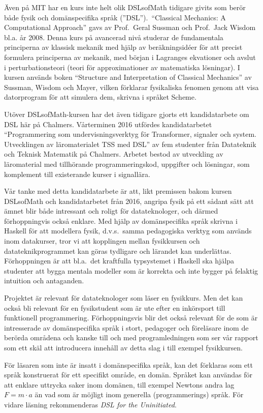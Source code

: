 \begin{draft}
Även på MIT har en kurs inte helt olik DSLsofMath tidigare givits som berör både
fysik och domänspecifika språk (''DSL'').\ ``Classical Mechanics: A Computational Approach'' gavs av
Prof.\ Geral Sussman och Prof.\ Jack Wisdom bl.a. år
2008.\cite{classical-mechanics-course-mit-2008}
Denna kurs på avancerad nivå studerar de fundamentala principerna av klassisk
mekanik med hjälp av beräkningsidéer för att precist formulera principerna av
mekanik, med början i Lagranges ekvationer och avslut i
perturbationsteori (teori för approximationer av matematiska lösningar). I kursen används boken ``Structure and %
Interpretation of Classical Mechanics'' av Sussman, Wisdom och Mayer,
vilken förklarar fysikaliska fenomen genom att visa datorprogram för att
simulera dem, skrivna i språket Scheme.\cite{SICM}

Utöver DSLsofMath-kursen har det även tidigare gjorts ett kandidatarbete om DSL 
här på Chalmers. Vårterminen 2016 utfördes kandidatarbetet
``Programmering som undervisningsverktyg för Transformer, signaler och
system. Utvecklingen av läromaterialet TSS med DSL'' av fem studenter
från Datateknik och Teknisk Matematik på Chalmers. Arbetet bestod av
utveckling av läromaterial med tillhörande programmeringskod,
uppgifter och lösningar, som komplement till existerande kurser i
signallära.\cite{kandidat2016}

Vår tanke med detta kandidatarbete är att, likt premissen bakom kursen DSLsofMath
och kandidatarbetet från 2016, angripa fysik på ett sådant sätt att ämnet blir både
intressant och roligt för datateknologer, och därmed förhoppningvis
också enklare. Med hjälp av domänspecifika språk skrivna i Haskell för att
modellera fysik, d.v.s.\ samma pedagogiska verktyg som används inom           %
datakurser, tror vi att kopplingen mellan fysikkursen och
datateknikprogrammet kan göras tydligare och lärandet kan underlättas.
Förhoppningen är att bl.a.\ det kraftfulla typsystemet i Haskell ska
hjälpa studenter att bygga mentala modeller som är korrekta och inte
bygger på felaktig intuition och antaganden.

Projektet är relevant för datateknologer som läser en fysikkurs. Men
det kan också bli relevant för en fysikstudent som är ute efter en
inkörsport till funktionell programmering. Förhoppningsvis blir det
också relevant för de som är intresserade av domänspecifika språk i
stort, pedagoger och föreläsare inom de berörda områdena och kanske
till och med programledningen som ser vår rapport som ett skäl att
introducera innehåll av detta slag i till exempel fysikkursen.

För läsaren som inte är insatt i domänspecifika språk, kan det
förklaras som ett språk konstruerat för ett specifikt område, en
domän. Språket kan användas för att enklare uttrycka saker inom
domänen, till exempel Newtons andra lag $F=m \cdot a$ än vad som är
möjligt inom generella (programmerings) språk. För vidare läsning
rekommenderas \textit{DSL for the Uninitiated}.\cite{DSLU}
\end{draft}

